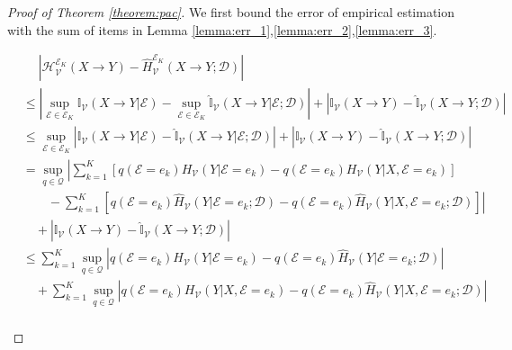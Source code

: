 \begin{proof}[Proof of Theorem \ref{theorem:pac}]
We first bound the error of empirical estimation with the sum of items in Lemma \ref{lemma:err_1},\ref{lemma:err_2},\ref{lemma:err_3}.
\begin{small}
\begin{align}
    &\quad\; |\mathcal H_\mathcal V^{\mathscr E_K}(X\rightarrow Y) - \hat{H}_\mathcal V^{\mathscr E_K}(X\rightarrow Y;\mathcal D)| \\
    &\leq \left|\sup_{\mathcal E \in \mathscr E_K} \mathbb{I}_{\mathcal{V}}(X\rightarrow Y| {\mathcal{E}}) - \sup_{\mathcal E \in \mathscr E_K} \hat{\mathbb{I}}_{\mathcal{V}}(X\rightarrow Y| {\mathcal{E}};\mathcal D)  \right| 
    + \left| \mathbb{I}_{\mathcal{V}}(X\rightarrow Y) - \hat{\mathbb{I}}_{\mathcal{V}}(X\rightarrow Y;\mathcal D)  \right| \\
    &\leq \sup_{\mathcal E \in \mathscr E_K} \left| \mathbb{I}_{\mathcal{V}}(X\rightarrow Y| {\mathcal{E}}) - \hat{\mathbb{I}}_{\mathcal{V}}(X\rightarrow Y| {\mathcal{E}};\mathcal D) \right| 
    + \left| \mathbb{I}_{\mathcal{V}}(X\rightarrow Y) - \hat{\mathbb{I}}_{\mathcal{V}}(X\rightarrow Y;\mathcal D)  \right| \\
    &= \sup_{q\in \mathcal Q}\left| \sum_{k=1}^K \left[{q}(\mathcal E=e_k)H_{\mathcal V}(Y|\mathcal E=e_k) - {q}(\mathcal E=e_k)H_{\mathcal V}(Y|X, \mathcal E=e_k)\right] \right. \\
    &\left. \quad\quad - \sum_{k=1}^K \left[ q(\mathcal E=e_k)\hat H_{\mathcal V}(Y|\mathcal E=e_k;\mathcal D) - q(\mathcal E=e_k)\hat H_{\mathcal V}(Y|X, \mathcal E=e_k;\mathcal D)\right] \right| \\
    &\quad + \left| \mathbb{I}_{\mathcal{V}}(X\rightarrow Y) - \hat{\mathbb{I}}_{\mathcal{V}}(X\rightarrow Y;\mathcal D)  \right| \\ 
    &\leq \sum_{k=1}^K \sup_{q\in \mathcal Q}\left| {q}(\mathcal E=e_k)H_{\mathcal V}(Y|\mathcal E=e_k) -  q(\mathcal E=e_k)\hat H_{\mathcal V}(Y|\mathcal E=e_k;\mathcal D) \right| \\
    &\quad + \sum_{k=1}^K \sup_{q \in \mathcal Q}\left| {q}(\mathcal E=e_k)H_{\mathcal V}(Y|X, \mathcal E=e_k) -  q(\mathcal E=e_k)\hat H_{\mathcal V}(Y|X, \mathcal E=e_k;\mathcal D) \right| \\

\end{align}
\end{small}
\end{proof}
